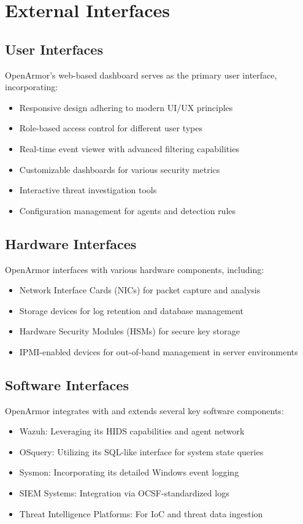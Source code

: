 \section{External Interfaces}

\subsection{User Interfaces}
OpenArmor's web-based dashboard serves as the primary user interface, incorporating:

\begin{itemize}
    \item Responsive design adhering to modern UI/UX principles
    \item Role-based access control for different user types
    \item Real-time event viewer with advanced filtering capabilities
    \item Customizable dashboards for various security metrics
    \item Interactive threat investigation tools
    \item Configuration management for agents and detection rules
\end{itemize}

\subsection{Hardware Interfaces}
OpenArmor interfaces with various hardware components, including:

\begin{itemize}
    \item Network Interface Cards (NICs) for packet capture and analysis
    \item Storage devices for log retention and database management
    \item Hardware Security Modules (HSMs) for secure key storage
    \item IPMI-enabled devices for out-of-band management in server environments
\end{itemize}

\subsection{Software Interfaces}
OpenArmor integrates with and extends several key software components:

\begin{itemize}
    \item Wazuh: Leveraging its HIDS capabilities and agent network
    \item OSquery: Utilizing its SQL-like interface for system state queries
    \item Sysmon: Incorporating its detailed Windows event logging
    \item SIEM Systems: Integration via OCSF-standardized logs
    \item Threat Intelligence Platforms: For IoC and threat data ingestion
\end{itemize}

